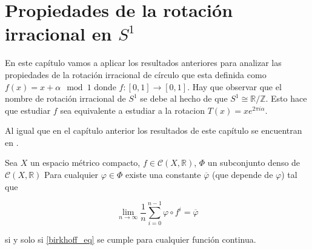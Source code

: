 \chapter{Propiedades de la rotación irracional en $S^1$}

En este capítulo vamos a aplicar los resultados anteriores para analizar las propiedades de la rotación irracional de círculo que esta definida como $f(x) = x + \alpha \mod 1$ donde $f: [0,1] \rightarrow [0,1]$. Hay que observar que el nombre de rotación irracional de $S^1$ se debe al hecho de que $S^1 \cong \mathbb{R}/\mathbb{Z}$. Esto hace que estudiar $f$ sea equivalente a estudiar a la rotacion $T(x) = x e^{2\pi i \alpha}$.

Al igual que en el capítulo anterior los resultados de este capítulo se encuentran en \cite{youtube}.

\begin{lema}\label{lema_varphi_m}
	Sea $X$ un espacio métrico compacto, $f \in \mathcal{C}(X,\mathbb{R})$, $\Phi$ un subconjunto denso de $\mathcal{C}(X, \mathbb{R})$ Para cualquier $\varphi \in \Phi$ existe una constante $\overline{\varphi}$ (que depende de $\varphi$) tal que
	
	\begin{equation}\label{birkhoff_eq}
		\lim_{n \rightarrow \infty} \frac{1}{n} \sum_{i=0}^{n-1} \varphi \circ f^i = \overline{\varphi}
	\end{equation}
	
	si y solo si \eqref{birkhoff_eq} se cumple para cualquier función continua.
\end{lema}

